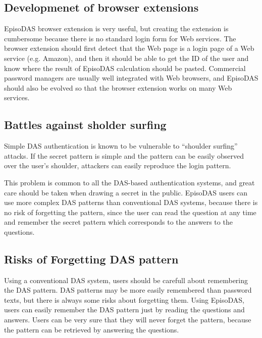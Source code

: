 \documentclass[sigconf]{acmart}
\begin{document}
\subsection{Developmenet of browser extensions}

EpisoDAS browser extension is very useful, but creating the extension
is cumbersome because there is no standard login form for
Web services.
%
The browser extension should first detect that the Web page is a login page
of a Web service (e.g. Amazon),
and then it should be able to get the ID of the user
and know where the result of EpisoDAS calculation should be pasted.
%
Commercial password managers\cite{OnePassword,Dashlane,LastPass,KeyPass,NortonIDSafe,IDManager}
are usually well integrated with Web browsers,
and EpisoDAS should also be evolved so that
the browser extension works on many Web services.

\subsection{Battles against sholder surfing}

Simple DAS authentication is known to be vulnerable to ``shoulder surfing''
attacks\cite{Aviv:2017:TBS:3134600.3134609}.
If the secret pattern is simple and
the pattern can be easily observed over the user's shoulder,
attackers can easily reproduce the login pattern.

This problem is common to all the DAS-based authentication systems,
and great care should be taken when drawing a secret in the public.
EpisoDAS users can use more complex DAS patterns than
conventional DAS systems,
because there is no risk of forgetting the pattern,
since the user can read the question at any time and
remember the secret pattern which corresponds to the
answers to the questions.

\subsection{Risks of Forgetting DAS pattern}

Using a conventional DAS system, users should be carefull about
remembering the DAS pattern.
DAS patterns may be more easily remembered than password texts,
but there is always some risks about forgetting them.
Using EpisoDAS, users can easily remember the DAS pattern
just by reading the questions and answers.
Users can be very sure that they will never forget the pattern,
because the pattern can be retrieved by answering the questions.
\end{document}
